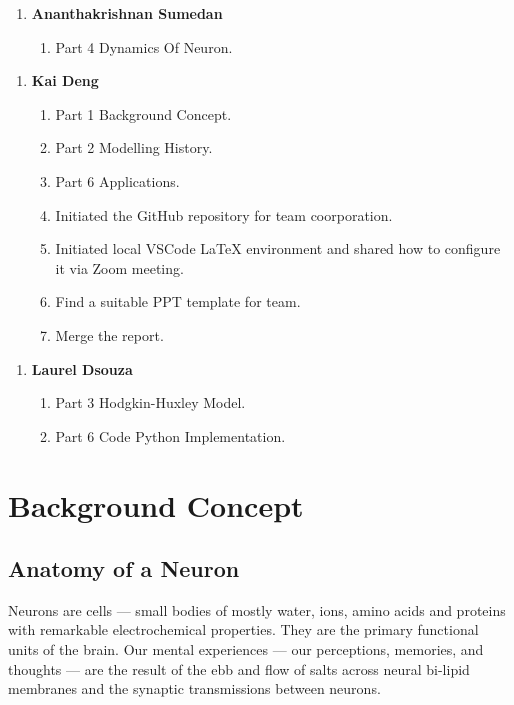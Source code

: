 \documentclass[12pt,a4paper]{report}
\begin{document}
\begin{enumerate}
    \item[] \textbf{Ananthakrishnan Sumedan}
    \begin{enumerate}
        \item Part 4 Dynamics Of Neuron.   
    \end{enumerate}
\end{enumerate}


\begin{enumerate}
    \item[] \textbf{Kai Deng}
    \begin{enumerate}
        \item Part 1 Background Concept. 
        \item Part 2 Modelling History.
        \item Part 6 Applications.
        \item Initiated the GitHub repository for team coorporation.
        \item Initiated local VSCode LaTeX environment and shared how to configure it via Zoom meeting.
        \item Find a suitable PPT template for team.
        \item Merge the report.
    \end{enumerate}
\end{enumerate}

\begin{enumerate}
    \item[] \textbf{Laurel Dsouza}
    \begin{enumerate}
        \item Part 3 Hodgkin-Huxley Model.
        \item Part 6 Code Python Implementation.
    \end{enumerate}
\end{enumerate}




\clearpage

\chapter{Background Concept}
\section{Anatomy of a Neuron}
Neurons are cells — small bodies of mostly water, ions, amino acids and proteins with remarkable electrochemical properties. They are the primary functional units of the brain. Our mental experiences — our perceptions, memories, and thoughts — are the result of the ebb and flow of salts across neural bi-lipid membranes and the synaptic transmissions between neurons. 
\end{document}
